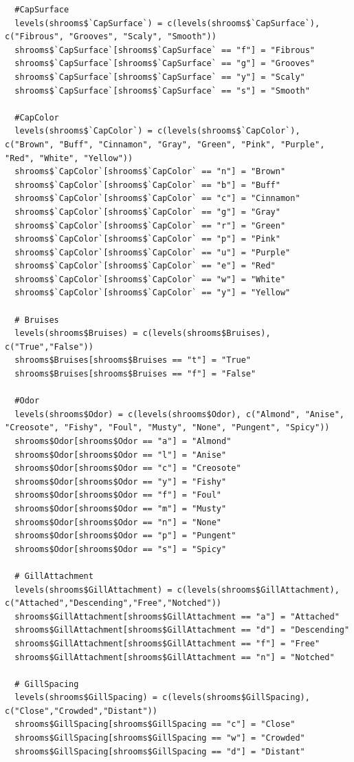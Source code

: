 \documentclass[10pt  ,usenames, dvipsnames]{article}\usepackage[]{graphicx}\usepackage[]{color}
\begin{document}
\begin{lstlisting}
  #CapSurface
  levels(shrooms$`CapSurface`) = c(levels(shrooms$`CapSurface`), c("Fibrous", "Grooves", "Scaly", "Smooth"))
  shrooms$`CapSurface`[shrooms$`CapSurface` == "f"] = "Fibrous"
  shrooms$`CapSurface`[shrooms$`CapSurface` == "g"] = "Grooves"
  shrooms$`CapSurface`[shrooms$`CapSurface` == "y"] = "Scaly"
  shrooms$`CapSurface`[shrooms$`CapSurface` == "s"] = "Smooth"
  
  #CapColor
  levels(shrooms$`CapColor`) = c(levels(shrooms$`CapColor`), c("Brown", "Buff", "Cinnamon", "Gray", "Green", "Pink", "Purple", "Red", "White", "Yellow"))
  shrooms$`CapColor`[shrooms$`CapColor` == "n"] = "Brown"
  shrooms$`CapColor`[shrooms$`CapColor` == "b"] = "Buff"
  shrooms$`CapColor`[shrooms$`CapColor` == "c"] = "Cinnamon"
  shrooms$`CapColor`[shrooms$`CapColor` == "g"] = "Gray"
  shrooms$`CapColor`[shrooms$`CapColor` == "r"] = "Green"
  shrooms$`CapColor`[shrooms$`CapColor` == "p"] = "Pink"
  shrooms$`CapColor`[shrooms$`CapColor` == "u"] = "Purple"
  shrooms$`CapColor`[shrooms$`CapColor` == "e"] = "Red"
  shrooms$`CapColor`[shrooms$`CapColor` == "w"] = "White"
  shrooms$`CapColor`[shrooms$`CapColor` == "y"] = "Yellow"
  
  # Bruises
  levels(shrooms$Bruises) = c(levels(shrooms$Bruises), c("True","False"))
  shrooms$Bruises[shrooms$Bruises == "t"] = "True"
  shrooms$Bruises[shrooms$Bruises == "f"] = "False"
  
  #Odor
  levels(shrooms$Odor) = c(levels(shrooms$Odor), c("Almond", "Anise", "Creosote", "Fishy", "Foul", "Musty", "None", "Pungent", "Spicy"))
  shrooms$Odor[shrooms$Odor == "a"] = "Almond"
  shrooms$Odor[shrooms$Odor == "l"] = "Anise"
  shrooms$Odor[shrooms$Odor == "c"] = "Creosote"
  shrooms$Odor[shrooms$Odor == "y"] = "Fishy"
  shrooms$Odor[shrooms$Odor == "f"] = "Foul"
  shrooms$Odor[shrooms$Odor == "m"] = "Musty"
  shrooms$Odor[shrooms$Odor == "n"] = "None"
  shrooms$Odor[shrooms$Odor == "p"] = "Pungent"
  shrooms$Odor[shrooms$Odor == "s"] = "Spicy"
  
  # GillAttachment
  levels(shrooms$GillAttachment) = c(levels(shrooms$GillAttachment), c("Attached","Descending","Free","Notched"))
  shrooms$GillAttachment[shrooms$GillAttachment == "a"] = "Attached"
  shrooms$GillAttachment[shrooms$GillAttachment == "d"] = "Descending"
  shrooms$GillAttachment[shrooms$GillAttachment == "f"] = "Free"
  shrooms$GillAttachment[shrooms$GillAttachment == "n"] = "Notched"
  
  # GillSpacing
  levels(shrooms$GillSpacing) = c(levels(shrooms$GillSpacing), c("Close","Crowded","Distant"))
  shrooms$GillSpacing[shrooms$GillSpacing == "c"] = "Close"
  shrooms$GillSpacing[shrooms$GillSpacing == "w"] = "Crowded"
  shrooms$GillSpacing[shrooms$GillSpacing == "d"] = "Distant"
  

\end{lstlisting}
\end{document}

